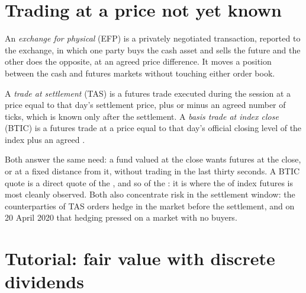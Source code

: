 \section{Trading at a price not yet known}

\begin{definition}\label{def:m1:basis-roll-and-delivery:efp}
An \emph{exchange for physical} (EFP) is a
privately negotiated transaction, reported to the exchange, in which one
party buys the cash asset and sells the future and the other does the
opposite, at an agreed price difference. It moves a position between the
cash and futures markets without touching either order book.
\end{definition}

\begin{definition}\label{def:m1:basis-roll-and-delivery:tas}
A \emph{trade at settlement} (TAS) is a futures
trade executed during the session at a price equal to that day's settlement
price, plus or minus an agreed number of ticks, which is known only after the
settlement. A \emph{basis trade at index close} (BTIC) is a futures trade at a price equal to that day's official
closing level of the index plus an agreed .
\end{definition}

Both answer the same need: a fund valued at the close wants futures at the
close, or at a fixed distance from it, without trading in the last thirty
seconds. A BTIC quote is a direct quote of the , and so of the : it is where the  of index futures is most
cleanly observed. Both also concentrate risk in the settlement window: the
counterparties of TAS orders hedge in the market before the settlement, and
on 20 April 2020 that hedging pressed on a market with no buyers.

\section{Tutorial: fair value with discrete dividends}\label{tut:m1:basis-roll-and-delivery:fv}

